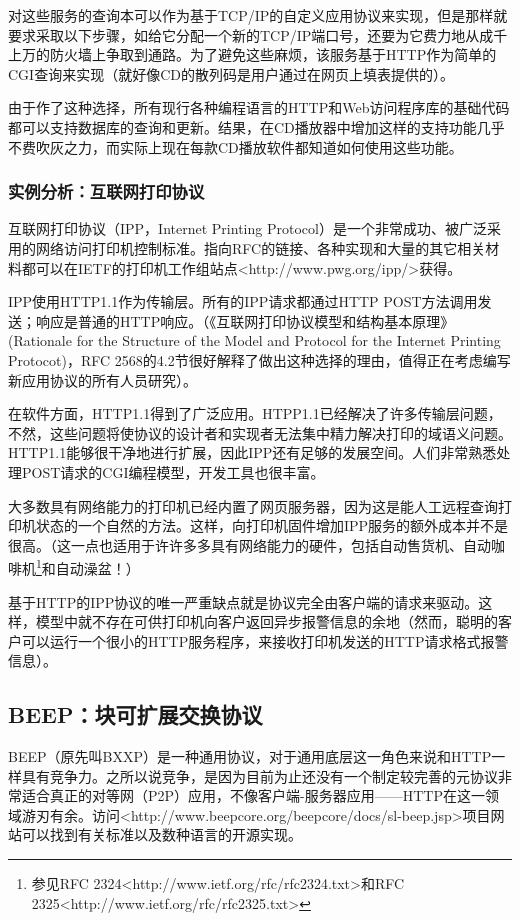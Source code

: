 \documentclass[12pt,oneside]{book}
\begin{document}
\begin{common-format}
对这些服务的查询本可以作为基于TCP/IP的自定义应用协议来实现，但是那样就要求采取以下步骤，如给它分配一个新的TCP/IP端口号，还要为它费力地从成千上万的防火墙上争取到通路。为了避免这些麻烦，该服务基于HTTP作为简单的CGI查询来实现（就好像CD的散列码是用户通过在网页上填表提供的）。

由于作了这种选择，所有现行各种编程语言的HTTP和Web访问程序库的基础代码都可以支持数据库的查询和更新。结果，在CD播放器中增加这样的支持功能几乎不费吹灰之力，而实际上现在每款CD播放软件都知道如何使用这些功能。

\subsubsection{实例分析：互联网打印协议}
互联网打印协议（IPP，Internet Printing Protocol）是一个非常成功、被广泛采用的网络访问打印机控制标准。指向RFC的链接、各种实现和大量的其它相关材料都可以在IETF的打印机工作组站点<http://www.pwg.org/ipp/>获得。

IPP使用HTTP1.1作为传输层。所有的IPP请求都通过HTTP POST方法调用发送；响应是普通的HTTP响应。（《互联网打印协议模型和结构基本原理》(Rationale for the Structure of the Model and Protocol for the Internet Printing Protocot)，RFC 2568的4.2节很好解释了做出这种选择的理由，值得正在考虑编写新应用协议的所有人员研究）。

在软件方面，HTTP1.1得到了广泛应用。HTPP1.1已经解决了许多传输层问题，不然，这些问题将使协议的设计者和实现者无法集中精力解决打印的域语义问题。HTTP1.1能够很干净地进行扩展，因此IPP还有足够的发展空间。人们非常熟悉处理POST请求的CGI编程模型，开发工具也很丰富。

大多数具有网络能力的打印机已经内置了网页服务器，因为这是能人工远程查询打印机状态的一个自然的方法。这样，向打印机固件增加IPP服务的额外成本并不是很高。（这一点也适用于许许多多具有网络能力的硬件，包括自动售货机、自动咖啡机\footnote{参见RFC 2324<http://www.ietf.org/rfc/rfc2324.txt>和RFC 2325<http://www.ietf.org/rfc/rfc2325.txt>}和自动澡盆！）

基于HTTP的IPP协议的唯一严重缺点就是协议完全由客户端的请求来驱动。这样，模型中就不存在可供打印机向客户返回异步报警信息的余地（然而，聪明的客户可以运行一个很小的HTTP服务程序，来接收打印机发送的HTTP请求格式报警信息）。

\subsection{BEEP：块可扩展交换协议}
BEEP（原先叫BXXP）是一种通用协议，对于通用底层这一角色来说和HTTP一样具有竞争力。之所以说竞争，是因为目前为止还没有一个制定较完善的元协议非常适合真正的对等网（P2P）应用，不像客户端-服务器应用——HTTP在这一领域游刃有余。访问<http://www.beepcore.org/beepcore/docs/sl-beep.jsp>项目网站可以找到有关标准以及数种语言的开源实现。
 

\end{common-format}
\end{document}
